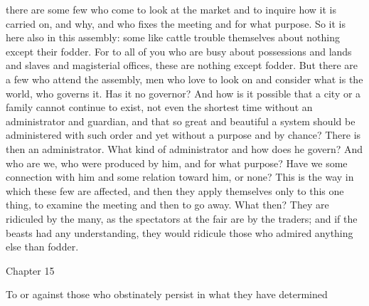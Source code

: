 \documentclass[a4paper]{article}
\begin{document}
there are some few who come to look at the market and to inquire how it is
carried on, and why, and who fixes the meeting and for what purpose. So it is
here also in this assembly: some like cattle trouble themselves about nothing
except their fodder. For to all of you who are busy about possessions and lands
and slaves and magisterial offices, these are nothing except fodder. But there
are a few who attend the assembly, men who love to look on and consider what is
the world, who governs it. Has it no governor? And how is it possible that a
city or a family cannot continue to exist, not even the shortest time without
an administrator and guardian, and that so great and beautiful a system should
be administered with such order and yet without a purpose and by chance? There
is then an administrator. What kind of administrator and how does he govern?
And who are we, who were produced by him, and for what purpose? Have we some
connection with him and some relation toward him, or none? This is the way in
which these few are affected, and then they apply themselves only to this one
thing, to examine the meeting and then to go away. What then? They are
ridiculed by the many, as the spectators at the fair are by the traders; and if
the beasts had any understanding, they would ridicule those who admired
anything else than fodder.

Chapter 15

To or against those who obstinately persist in what they have determined
\end{document}
